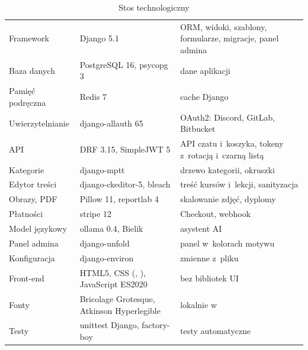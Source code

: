 \begin{table}[H]
\centering\small
\caption{Stos technologiczny}
\begin{tabularx}{\linewidth}{@{}P{3.6cm}P{3.3cm}L@{}}
\toprule
{} &  &  \\
\midrule
Framework & Django 5.1 & ORM, widoki, szablony, formularze, migracje, panel admina \\
Baza danych & PostgreSQL 16, psycopg 3 & dane aplikacji \\
Pamięć podręczna & Redis 7 & cache Django \\
Uwierzytelnianie & django-allauth 65 & OAuth2: Discord, GitLab, Bitbucket \\
API & DRF 3.15, SimpleJWT 5 & API czatu i~koszyka, tokeny z~rotacją i~czarną listą \\
Kategorie & django-mptt & drzewo kategorii, okruszki \\
Edytor treści & django-ckeditor-5, bleach & treść kursów i~lekcji, sanityzacja \\
Obrazy, PDF & Pillow 11, reportlab 4 & skalowanie zdjęć, dyplomy \\
Płatności & stripe 12 & Checkout, webhook \\
Model językowy & ollama 0.4, Bielik & asystent AI \\
Panel admina & django-unfold & panel w~kolorach motywu \\
Konfiguracja & django-environ & zmienne z~pliku  \\
Front-end & HTML5, CSS (, ), JavaScript ES2020 & bez bibliotek UI \\
Fonty & Bricolage Grotesque, Atkinson Hyperlegible & lokalnie w~ \\
Testy & unittest Django, factory-boy & testy automatyczne \\
\bottomrule
\end{tabularx}
\end{table}
